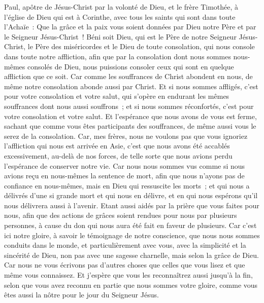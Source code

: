 \begin{multicols}{2}
\VerseOne{}Paul, apôtre de Jésus-Christ par la volonté de Dieu, et le frère Timothée, à l'église de Dieu qui est à Corinthe, avec tous les saints qui sont dans toute l'Achaïe~:
Que la grâce et la paix vous soient données par Dieu notre Père et par le Seigneur Jésus-Christ~!
Béni soit Dieu, qui est le Père de notre Seigneur Jésus-Christ, le Père des miséricordes et le Dieu de toute consolation,
qui nous console dans toute notre affliction, afin que par la consolation dont nous sommes nous-mêmes consolés de Dieu, nous puissions consoler ceux qui sont en quelque affliction que ce soit.
Car comme les souffrances de Christ abondent en nous, de même notre consolation abonde aussi par Christ.
Et si nous sommes affligés, c'est pour votre consolation et votre salut, qui s'opère en endurant les mêmes souffrances dont nous aussi souffrons~; et si nous sommes réconfortés, c'est pour votre consolation et votre salut.
Et l'espérance que nous avons de vous est ferme, sachant que comme vous êtes participants des souffrances, de même aussi vous le serez de la consolation.
Car, mes frères, nous ne voulons pas que vous ignoriez l'affliction qui nous est arrivée en Asie, c'est que nous avons été accablés excessivement, au-delà de nos forces, de telle sorte que nous avions perdu l'espérance de conserver notre vie.
Car nous nous sommes vus comme si nous avions reçu en nous-mêmes la sentence de mort, afin que nous n'ayons pas de confiance en nous-mêmes, mais en Dieu qui ressuscite les morts~;
et qui nous a délivrés d'une si grande mort et qui nous en délivre, et en qui nous espérons qu'il nous délivrera aussi à l'avenir.
Etant aussi aidés par la prière que vous faites pour nous, afin que des actions de grâces soient rendues pour nous par plusieurs personnes, à cause du don qui nous aura été fait en faveur de plusieurs.
Car c'est ici notre gloire, à savoir le témoignage de notre conscience, que nous nous sommes conduits dans le monde, et particulièrement avec vous, avec la simplicité et la sincérité de Dieu, non pas avec une sagesse charnelle, mais selon la grâce de Dieu.
Car nous ne vous écrivons pas d'autres choses que celles que vous lisez et que même vous connaissez. Et j'espère que vous les reconnaîtrez aussi jusqu'à la fin,
selon que vous avez reconnu en partie que nous sommes votre gloire, comme vous êtes aussi la nôtre pour le jour du Seigneur Jésus.

\end{multicols}
